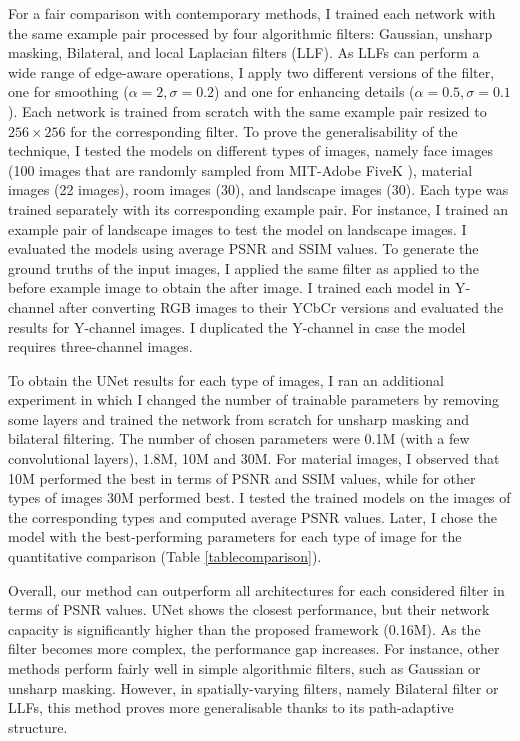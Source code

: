 For a fair comparison with contemporary methods, I trained each network with the same example pair processed by four algorithmic filters: Gaussian, unsharp masking, Bilateral, and local Laplacian filters (LLF). As LLFs can perform a wide range of edge-aware operations, I apply two different versions of the filter, one for smoothing ($\alpha=2,  \sigma=0.2$) and one for enhancing details ($\alpha=0.5, \sigma=0.1$). Each network is trained from scratch with the same example pair resized to $256 \times 256$ for the corresponding filter. 
To prove the generalisability of the technique, I tested the models on different types of images, namely face images (100 images that are randomly sampled from MIT-Adobe FiveK \cite{Bychkovsky11Learning}), material images (22 images), room images (30), and landscape images (30). Each type was trained separately with its corresponding example pair. For instance, I trained an example pair of landscape images to test the model on landscape images. I evaluated the models using average PSNR and SSIM values. To generate the ground truths of the input images, I applied the same filter as applied to the before example image to obtain the after image. I trained each model in Y-channel after converting RGB images to their YCbCr versions and evaluated the results for Y-channel images. I duplicated the Y-channel in case the model requires three-channel images. 


To obtain the UNet results for each type of images, I ran an additional experiment in which I changed the number of trainable parameters by removing some layers and trained the network from scratch for unsharp masking and bilateral filtering. The number of chosen parameters were 0.1M (with a few convolutional layers), 1.8M, 10M and 30M. For material images, I observed that 10M performed the best in terms of PSNR and SSIM values, while for other types of images 30M performed best. I tested the trained models on the images of the corresponding types and computed average PSNR values. Later, I chose the model with the best-performing parameters for each type of image for the quantitative comparison (Table \ref{tablecomparison}).

Overall, our method can outperform all architectures for each considered filter in terms of PSNR values. UNet shows the closest performance, but their network capacity is significantly higher than the proposed framework (0.16M). As the filter becomes more complex, the performance gap increases. For instance, other methods perform fairly well in simple algorithmic filters, such as Gaussian or unsharp masking. However, in spatially-varying filters, namely Bilateral filter or LLFs, this method proves more generalisable thanks to its path-adaptive structure. 

